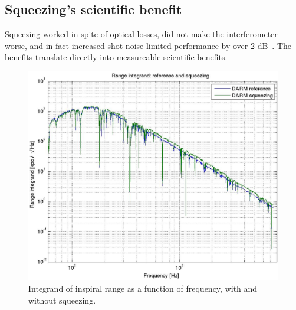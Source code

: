 







\subsection{Squeezing's scientific benefit}

Squeezing worked in spite of optical losses, did not make the interferometer worse, and in fact increased shot noise limited performance by over 2 dB~\cite{BarsottiNatureSqueezing}.
The benefits translate directly into measureable scientific benefits.

\begin{figure}
\begin{center}
\includegraphics[trim=30 30 30 30, clip, height=0.5\paperheight, width=0.5\paperwidth,keepaspectratio]{range_integrand.eps}
\caption{Integrand of inspiral range as a function of frequency, with and without squeezing.}
\label{squeezing_range_integrand}
\end{center}
\end{figure}

